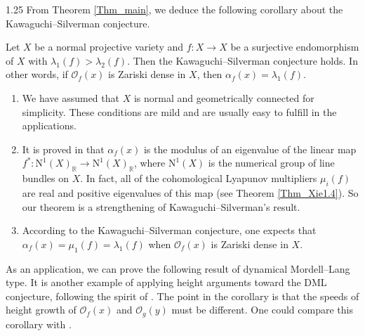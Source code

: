 \documentclass[12pt]{amsart}
\newcommand\mO{\mathcal{O}}
\newcommand\ra{\rightarrow}
\begin{document}
\begin{spacing}{1.25}
From Theorem \ref{Thm_main}, we deduce the following corollary about the Kawaguchi--Silverman conjecture.

\begin{corollary}
Let $X$ be a normal projective variety and $f:X\ra X$ be a surjective endomorphism of $X$ with $\lambda_1(f)>\lambda_2(f)$. Then the Kawaguchi--Silverman conjecture holds. In other words, if $\mO_f(x)$ is Zariski dense in $X$, then $\alpha_f(x)=\lambda_1(f)$. 
\end{corollary}

\begin{remark}
\begin{enumerate}
\item
We have assumed that $X$ is normal and geometrically connected for simplicity. These conditions are mild and are usually easy to fulfill in the applications.

\item
It is proved in \cite{KS16} that $\alpha_f(x)$ is the modulus of an eigenvalue of the linear map $f^*:\mathrm{N}^1(X)_{\mathbb{R}}\rightarrow\mathrm{N}^1(X)_{\mathbb{R}}$, where $\mathrm{N}^1(X)$ is the numerical group of line bundles on $X$. In fact, all of the cohomological Lyapunov multipliers $\mu_i(f)$ are real and positive eigenvalues of this map (see Theorem \ref{Thm_Xie1.4}). So our theorem is a strengthening of Kawaguchi--Silverman's result.

\item According to the Kawaguchi--Silverman conjecture, one expects that $\alpha_f(x)=\mu_1(f)=\lambda_1(f)$ when $\mO_f(x)$ is Zariski dense in $X$.
\end{enumerate}
\end{remark}

As an application, we can prove the following result of dynamical Mordell--Lang type. It is another example of applying height arguments toward the DML conjecture, following the spirit of \cite{XY}. The point in the corollary is that the speeds of height growth of $\mathcal{O}_f(x)$ and $\mathcal{O}_g(y)$ must be different. One could compare this corollary with \cite[Proposition 4.1]{XY}.


\end{spacing}
\end{document}
